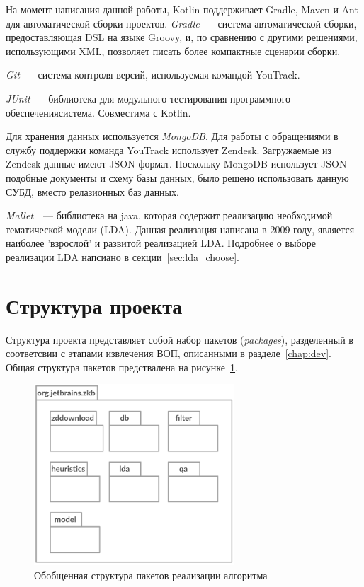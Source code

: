 На момент написания данной работы, Kotlin поддерживает Gradle, Maven и Ant для автоматической сборки проектов. \textit{Gradle}~--- система автоматической сборки, предоставляющая DSL на языке Groovy, и, по сравнению с другими решениями, использующими XML, позволяет писать более компактные сценарии сборки.


\textit{Git}~--- система контроля версий, используемая командой YouTrack.

\textit{JUnit}~--- библиотека для модульного тестирования программного обеспечениясистема. Совместима с Kotlin.

Для хранения данных используется \textit{MongoDB}. Для работы с обращениями в службу поддержки команда YouTrack использует Zendesk. Загружаемые из Zendesk данные имеют JSON формат. Поскольку MongoDB использует JSON-подобные документы и схему базы данных, было решено использовать данную СУБД, вместо релазионных баз данных.

\textit{Mallet}~\cite{MALLET}~--- библиотека на java, которая содержит реализацию необходимой тематической модели (LDA). Данная реализация написана в 2009 году, является наиболее 'взрослой' и развитой реализацией LDA. Подробнее о выборе реализации LDA напсиано в секции~\ref{sec:lda_choose}.

\section{Структура проекта}

Структура проекта представляет собой набор пакетов (\textit{packages}), разделенный в соответсвии с этапами извлечения ВОП, описанными в разделе~\ref{chap:dev}. Общая структура пакетов предствалена на рисунке~\ref{fig:pckgs}. 

\begin{figure}[tph!]
\centerline{\includegraphics[width=7.5cm]{fig/pckgs.png}}
    \caption{Обобщенная структура пакетов реализации алгоритма}
    \label{fig:pckgs}
\end{figure}

